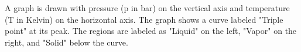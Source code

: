 A graph is drawn with pressure (p in bar) on the vertical axis and temperature (T in Kelvin) on the horizontal axis. The graph shows a curve labeled "Triple point" at its peak. The regions are labeled as "Liquid" on the left, "Vapor" on the right, and "Solid" below the curve.